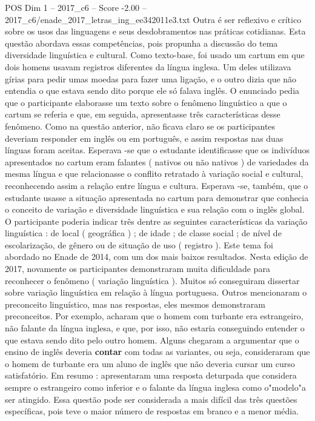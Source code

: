 \begin{textsample}{POS Dim 1 – 2017\_c6 – Score -2.00 – 2017\_c6/enade\_2017\_letras\_ing\_ee342011e3.txt}
Outra é ser reflexivo e crítico sobre os usos das linguagens e seus desdobramentos nas práticas cotidianas.
Esta questão abordava essas competências, pois propunha a discussão do tema diversidade linguística e cultural.
Como texto-base, foi usado um cartum em que dois homens usavam registros diferentes da língua inglesa.
Um deles utilizava gírias para pedir umas moedas para fazer uma ligação, e o outro dizia que não entendia o que estava sendo dito porque ele só falava inglês.
O enunciado pedia que o participante elaborasse um texto sobre o fenômeno linguístico a que o cartum se referia e que, em seguida, apresentasse três características desse fenômeno.
Como na questão anterior, não ficava claro se os participantes deveriam responder em inglês ou em português, e assim respostas nas duas línguas foram aceitas.
Esperava -se que o estudante identificasse que os indivíduos apresentados no cartum eram falantes ( nativos ou não nativos ) de variedades da mesma língua e que relacionasse o conflito retratado à variação social e cultural, reconhecendo assim a relação entre língua e cultura.
Esperava -se, também, que o estudante usasse a situação apresentada no cartum para demonstrar que conhecia o conceito de variação e diversidade linguística e sua relação com o inglês global.
O participante poderia indicar três dentre as seguintes características da variação linguística : de local ( geográfica ) ; de idade ; de classe social ; de nível de escolarização, de gênero ou de situação de uso ( registro ).
Este tema foi abordado no Enade de 2014, com um dos mais baixos resultados.
Nesta edição de 2017, novamente os participantes demonstraram muita dificuldade para reconhecer o fenômeno ( variação linguística ).
Muitos só conseguiram dissertar sobre variação linguística em relação à língua portuguesa.
Outros mencionaram o preconceito linguístico, mas nas respostas, eles mesmos demonstraram preconceitos.
Por exemplo, acharam que o homem com turbante era estrangeiro, não falante da língua inglesa, e que, por isso, não estaria conseguindo entender o que estava sendo dito pelo outro homem.
Alguns chegaram a argumentar que o ensino de inglês deveria \textbf{contar} com todas as variantes, ou seja, consideraram que o homem de turbante era um aluno de inglês que não deveria cursar um curso satisfatório.
Em resumo : apresentaram uma resposta deturpada que considera sempre o estrangeiro como inferior e o falante da língua inglesa como o"modelo"a ser atingido.
Essa questão pode ser considerada a mais difícil das três questões específicas, pois teve o maior número de respostas em branco e a menor média.

\end{textsample}
